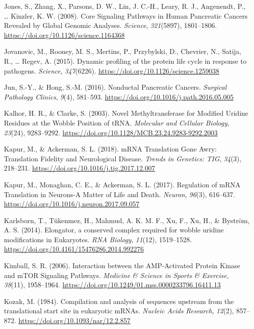 \documentclass[12pt,openany]{book}
\begin{document}
\hypertarget{ref-Jones2008}{}
Jones, S., Zhang, X., Parsons, D. W., Lin, J. C.-H., Leary, R. J.,
Angenendt, P., \ldots{} Kinzler, K. W. (2008). Core Signaling Pathways
in Human Pancreatic Cancers Revealed by Global Genomic Analyses.
\emph{Science}, \emph{321}(5897), 1801--1806.
\url{https://doi.org/10.1126/science.1164368}

\hypertarget{ref-Jovanovic2015}{}
Jovanovic, M., Rooney, M. S., Mertins, P., Przybylski, D., Chevrier, N.,
Satija, R., \ldots{} Regev, A. (2015). Dynamic profiling of the protein
life cycle in response to pathogens. \emph{Science}, \emph{347}(6226).
\url{https://doi.org/10.1126/science.1259038}

\hypertarget{ref-Jun2016}{}
Jun, S.-Y., \& Hong, S.-M. (2016). Nonductal Pancreatic Cancers.
\emph{Surgical Pathology Clinics}, \emph{9}(4), 581--593.
\url{https://doi.org/10.1016/j.path.2016.05.005}

\hypertarget{ref-Kalhor2003}{}
Kalhor, H. R., \& Clarke, S. (2003). Novel Methyltransferase for
Modified Uridine Residues at the Wobble Position of tRNA.
\emph{Molecular and Cellular Biology}, \emph{23}(24), 9283--9292.
\url{https://doi.org/10.1128/MCB.23.24.9283-9292.2003}

\hypertarget{ref-Kapur2018}{}
Kapur, M., \& Ackerman, S. L. (2018). mRNA Translation Gone Awry:
Translation Fidelity and Neurological Disease. \emph{Trends in Genetics:
TIG}, \emph{34}(3), 218--231.
\url{https://doi.org/10.1016/j.tig.2017.12.007}

\hypertarget{ref-Kapur2017}{}
Kapur, M., Monaghan, C. E., \& Ackerman, S. L. (2017). Regulation of
mRNA Translation in Neurons-A Matter of Life and Death. \emph{Neuron},
\emph{96}(3), 616--637.
\url{https://doi.org/10.1016/j.neuron.2017.09.057}

\hypertarget{ref-Karlsborn2014}{}
Karlsborn, T., Tükenmez, H., Mahmud, A. K. M. F., Xu, F., Xu, H., \&
Byström, A. S. (2014). Elongator, a conserved complex required for
wobble uridine modifications in Eukaryotes. \emph{RNA Biology},
\emph{11}(12), 1519--1528.
\url{https://doi.org/10.4161/15476286.2014.992276}

\hypertarget{ref-Kimball2006}{}
Kimball, S. R. (2006). Interaction between the AMP-Activated Protein
Kinase and mTOR Signaling Pathways. \emph{Medicine \& Science in Sports
\& Exercise}, \emph{38}(11), 1958--1964.
\url{https://doi.org/10.1249/01.mss.0000233796.16411.13}

\hypertarget{ref-Kozak1984}{}
Kozak, M. (1984). Compilation and analysis of sequences upstream from
the translational start site in eukaryotic mRNAs. \emph{Nucleic Acids
Research}, \emph{12}(2), 857--872.
\url{https://doi.org/10.1093/nar/12.2.857}
\end{document}
